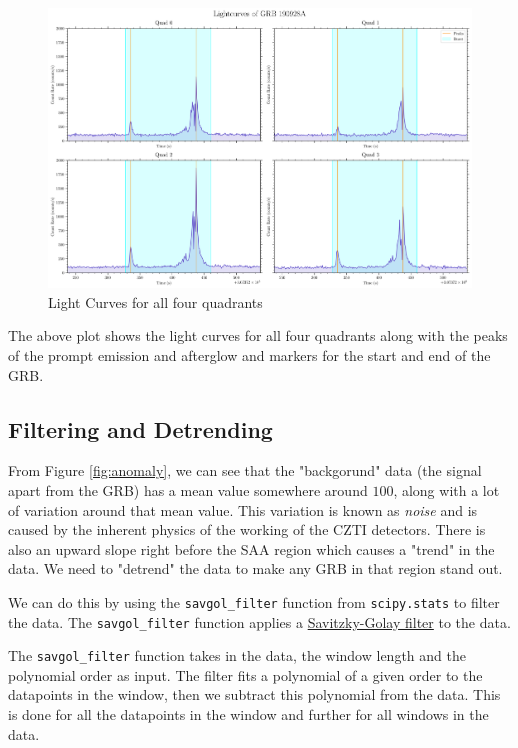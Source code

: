 \documentclass[11pt]{book} %
\begin{document}
\begin{figure}[H]
    \centering
    \includegraphics[scale=0.35]{Pictures/allquads.png}
    \caption{Light Curves for all four quadrants}
\end{figure}

The above plot shows the light curves for all four quadrants along with the peaks of the prompt emission and afterglow and markers for the start and end of the GRB.

\subsection{Filtering and Detrending}
%
%
%
%
From Figure \ref{fig:anomaly}, we can see that the "backgorund" data (the signal apart from the GRB) has a mean value somewhere around $100$, along with a lot of variation around that mean value. This variation is known as \textit{noise} and is caused by the inherent physics of the working of the CZTI detectors. There is also an upward slope right before the SAA region which causes a "trend" in the data. We need to "detrend" the data to make any GRB in that region stand out. 

We can do this by using the \lstinline[language=Python]{savgol_filter} function from \lstinline{scipy.stats} to filter the data. The \lstinline[language=Python]{savgol_filter} function applies a \href{https://en.wikipedia.org/wiki/Savitzky%E2%80%93Golay_filter}{Savitzky-Golay filter} to the data. 

The \lstinline[language=Python]{savgol_filter} function takes in the data, the window length and the polynomial order as input. The filter fits a polynomial of a given order to the datapoints in the window, then we subtract this polynomial from the data. This is done for all the datapoints in the window and further for all windows in the data.
\end{document}
